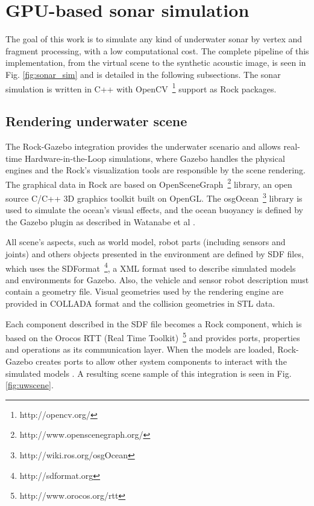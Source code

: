 \documentclass[final,5p,times]{elsarticle}
\begin{document}

\section{GPU-based sonar simulation}
\label{dev}

The goal of this work is to simulate any kind of underwater sonar by vertex and fragment processing, with a low computational cost. The complete pipeline of this implementation, from the virtual scene to the synthetic acoustic image, is seen in Fig. \ref{fig:sonar_sim} and is detailed in the following subsections. The sonar simulation is written in C++ with OpenCV~\footnote{http://opencv.org/} support as Rock packages.


\subsection{Rendering underwater scene}
\label{dev:uwscene}

The Rock-Gazebo integration \cite{watanabe2015} provides the underwater scenario and allows real-time Hardware-in-the-Loop simulations, where Gazebo handles the physical engines and the Rock's visualization tools are responsible by the scene rendering. The graphical data in Rock are based on OpenSceneGraph~\footnote{http://www.openscenegraph.org/} library, an open source C/C++ 3D graphics toolkit built on OpenGL. The osgOcean~\footnote{http://wiki.ros.org/osgOcean} library is used to simulate the ocean's visual effects, and the ocean buoyancy is defined by the Gazebo plugin as described in Watanabe et al \cite{watanabe2015}.

All scene's aspects, such as world model, robot parts (including sensors and joints) and others objects presented in the environment are defined by SDF files, which uses the SDFormat~\footnote{http://sdformat.org}, a XML format used to describe simulated models and environments for Gazebo. Also, the vehicle and sensor robot description must contain a geometry file. Visual geometries used by the rendering engine are provided in COLLADA format and the collision geometries in STL data.

Each component described in the SDF file becomes a Rock component, which is based on the Orocos RTT (Real Time Toolkit)~\footnote{http://www.orocos.org/rtt} and provides ports, properties and operations as its communication layer. When the models are loaded, Rock-Gazebo creates ports to allow other system components to interact with the simulated models \cite{cerqueira2016}. A resulting scene sample of this integration is seen in Fig. \ref{fig:uwscene}.
\end{document}
